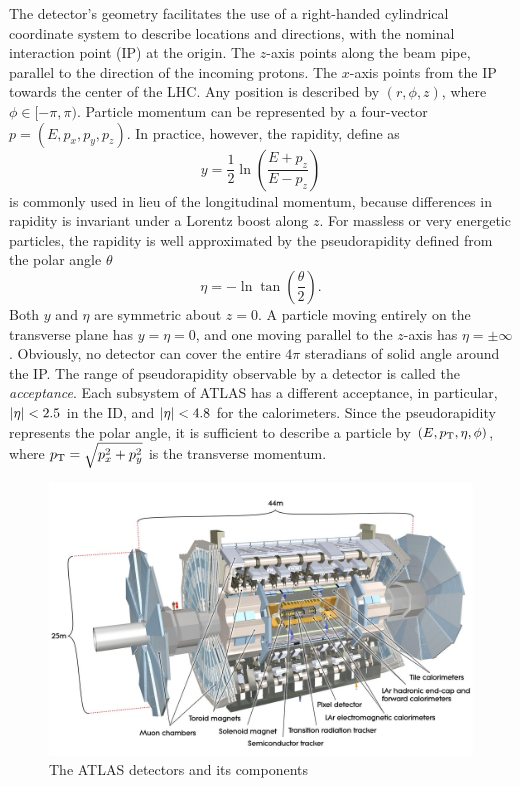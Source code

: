 The detector's geometry facilitates the use of a right-handed cylindrical coordinate system to describe locations and directions, with the nominal interaction point (IP) at the origin. The $z$-axis points along the beam pipe, parallel to the direction of the incoming protons. The $x$-axis points from the IP towards the center of the LHC. Any position is described by $(r, \phi, z)$, where $\phi \in [-\pi, \pi)$. Particle momentum can be represented by a four-vector $p=(E, p_x, p_y, p_z)$. In practice, however, the rapidity, define as 
\begin{equation}
    \label{eq:3.1}
    y = \frac{1}{2}\ln\left( \frac{E+p_z}{E-p_z} \right)
\end{equation}
is commonly used in lieu of the longitudinal momentum, because differences in rapidity is invariant under a Lorentz boost along $z$. For massless or very energetic particles, the rapidity is well approximated by the pseudorapidity defined from the polar angle $\theta$
\begin{equation}
    \label{eq:3.2}
    \eta = -\ln \tan \left ( \frac{\theta}{2} \right).
\end{equation}
Both $y$ and $\eta$ are symmetric about $z=0$. A particle moving entirely on the transverse plane has $y=\eta=0$, and one moving parallel to the $z$-axis has $\eta=\pm\infty$. 
Obviously, no detector can cover the entire $4\pi$ steradians of solid angle around the IP. 
The range of pseudorapidity observable by a detector is called the \textit{acceptance}. 
Each subsystem of ATLAS has a different acceptance, in particular, $\abs{\eta}<2.5$ in the ID, and $\abs{\eta}<4.8$ for the calorimeters. Since the pseudorapidity represents the polar angle, it is sufficient to describe a particle by $(E, p_{\text{T}}, \eta, \phi)$, where $p_{\text{T}} = \sqrt{p_x^2 + p_y^2}$ is the transverse momentum.

\begin{figure}[h!]
    \centering
    \includegraphics[width=0.9\linewidth]{figures/atlas.jpg}
    \caption{The ATLAS detectors and its components \cite{Pequenao:1095924}}
    \label{fig:atlas-schematic}
\end{figure}

